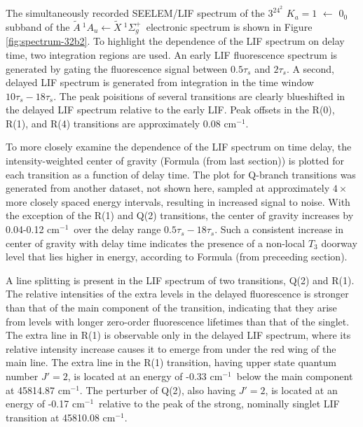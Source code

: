\documentclass[12pt]{mitthesis}
\newcommand{\rcm}{cm$^{-1}$}
\newcommand{\AtoX}{$
  \tilde{A} \: ^1\!A_u 
  \leftarrow 
  \tilde{X} \: ^1\Sigma_g^+
  $}
\newcommand{\Ka}[1]{$K_a\!\!=\!#1$}
\begin{document}
The simultaneously recorded SEELEM/LIF spectrum of the $3^24^2$ \Ka{1}
$\leftarrow$ $0_0$ subband of the \AtoX\ electronic spectrum is shown
in Figure \ref{fig:spectrum-32b2}. To highlight the dependence of the
LIF spectrum on delay time, two integration regions are used.  An
early LIF fluorescence spectrum is generated by gating the
fluorescence signal between $0.5\tau_s$ and $2\tau_s$.  A second,
delayed LIF spectrum is generated from integration in the time window
$10\tau_s-18\tau_s$.  The peak poisitions of several transitions are
clearly blueshifted in the delayed LIF spectrum relative to the early
LIF.  Peak offsets in the R(0), R(1), and R(4) transitions are
approximately 0.08 \rcm.

To more closely examine the dependence of the LIF spectrum on time
delay, the intensity-weighted center of gravity (Formula (from last
section)) is plotted for each transition as a function of delay time.
The plot for Q-branch transitions was generated from another dataset,
not shown here, sampled at approximately $4 \times$ more closely
spaced energy intervals, resulting in increased signal to noise.  With
the exception of the R(1) and Q(2) transitions, the center of gravity
increases by 0.04-0.12 \rcm\ over the delay range
$0.5\tau_s-18\tau_s$.  Such a consistent increase in center of gravity
with delay time indicates the presence of a non-local $T_3$ doorway
level that lies higher in energy, according to Formula (from
preceeding section).


A line splitting is present in the LIF spectrum of two transitions,
Q(2) and R(1).  The relative intensities of the extra levels in the
delayed fluorescence is stronger than that of the main component of
the transition, indicating that they arise from levels with longer
zero-order fluorescence lifetimes than that of the singlet.  The extra
line in R(1) is observable only in the delayed LIF spectrum, where its
relative intensity increase causes it to emerge from under the red
wing of the main line.  The extra line in the R(1) transition, having
upper state quantum number $J'=2$, is located at an energy of -0.33
\rcm\ below the main component at 45814.87 \rcm.  The perturber of
Q(2), also having $J'=2$, is located at an energy of -0.17 \rcm\
relative to the peak of the strong, nominally singlet LIF transition
at 45810.08 \rcm.
\end{document}
